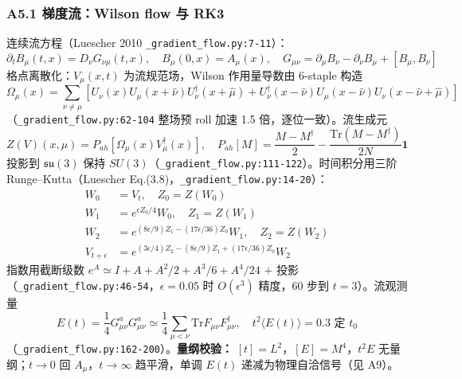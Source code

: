 \documentclass[UTF8]{ctexart}
\begin{document}
\subsubsection{A5.1 梯度流：Wilson flow 与 RK3}
连续流方程（Luescher 2010 \texttt{\nolinkurl{\_gradient\_flow.py:7-11}}）：
\begin{equation}
\partial_t B_\mu(t,x) = D_\nu G_{\nu\mu}(t,x),\quad B_\mu(0,x)=A_\mu(x),\quad G_{\mu\nu}= \partial_\mu B_\nu-\partial_\nu B_\mu+[B_\mu,B_\nu]
\label{eq:flow_cont}
\end{equation}
格点离散化：$V_\mu(x,t)$ 为流规范场，Wilson 作用量导数由 6-staple 构造
\begin{equation}
\Omega_\mu(x)=\sum_{\nu\ne\mu}\left[U_\nu(x)U_\mu(x+\hat\nu)U^\dagger_\nu(x+\hat\mu)+U^\dagger_\nu(x-\hat\nu)U_\mu(x-\hat\nu)U_\nu(x-\hat\nu+\hat\mu)\right]
\label{eq:staple}
\end{equation}
（\texttt{\nolinkurl{\_gradient\_flow.py:62-104}} 整场预 roll 加速 1.5 倍，逐位一致）。流生成元
\begin{equation}
Z(V)(x,\mu)=P_{ah}\left[\Omega_\mu(x)V^\dagger_\mu(x)\right],\quad P_{ah}[M]=\frac{M-M^\dagger}{2}-\frac{\mathrm{Tr}(M-M^\dagger)}{2N}\mathbf{1}
\label{eq:Zdef}
\end{equation}
投影到 $\mathfrak{su}(3)$ 保持 $SU(3)$（\texttt{\nolinkurl{\_gradient\_flow.py:111-122}}）。时间积分用三阶 Runge--Kutta（Luescher Eq.(3.8)，\texttt{\nolinkurl{\_gradient\_flow.py:14-20}}）：
\begin{align}
W_0 &= V_t,\quad Z_0=Z(W_0) \nonumber\\
W_1 &= e^{\epsilon Z_0/4}W_0,\quad Z_1=Z(W_1) \nonumber\\
W_2 &= e^{(8\epsilon/9)Z_1-(17\epsilon/36)Z_0}W_1,\quad Z_2=Z(W_2) \label{eq:RK3}\\
V_{t+\epsilon} &= e^{(3\epsilon/4)Z_2-(8\epsilon/9)Z_1+(17\epsilon/36)Z_0}W_2 \nonumber
\end{align}
指数用截断级数 $e^A\simeq I+A+A^2/2+A^3/6+A^4/24$ $+$ 投影（\texttt{\nolinkurl{\_gradient\_flow.py:46-54}}，$\epsilon=0.05$ 时 $O(\epsilon^3)$ 精度，60 步到 $t=3$）。流观测量
\begin{equation}
E(t)=\frac14 G^{a}_{\mu\nu}G^{a}_{\mu\nu}\simeq \frac14\sum_{\mu<\nu}\mathrm{Tr} F_{\mu\nu}F^\dagger_{\mu\nu},\quad t^2\langle E(t)\rangle=0.3 \text{ 定 }t_0
\label{eq:Et0}
\end{equation}
（\texttt{\nolinkurl{\_gradient\_flow.py:162-200}}）。\textbf{量纲校验：} $[t]=L^2$，$[E]=M^4$，$t^2E$ 无量纲；$t\to0$ 回 $A_\mu$，$t\to\infty$ 趋平滑，单调 $E(t)$ 递减为物理自洽信号（见 A9）。
\end{document}
